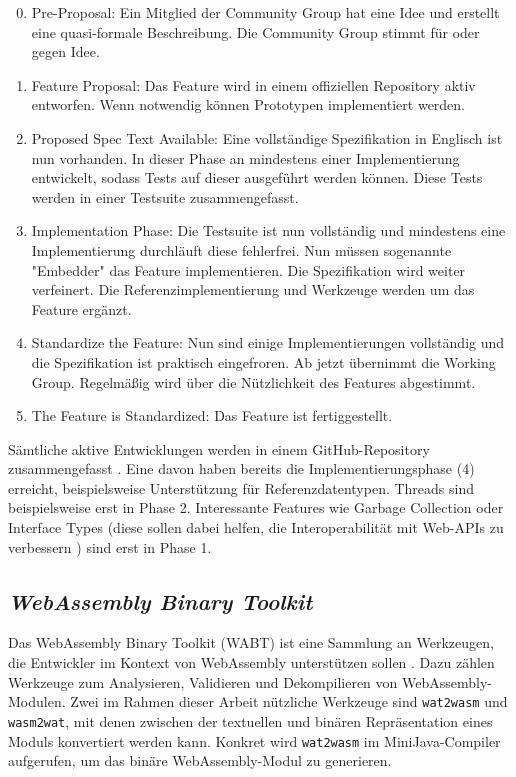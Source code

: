 \begin{enumerate}
    \setcounter{enumi}{-1}
    \item Pre-Proposal: Ein Mitglied der Community Group hat eine Idee und erstellt eine quasi-formale Beschreibung. Die Community Group stimmt für oder gegen Idee.
    \item Feature Proposal: Das Feature wird in einem offiziellen Repository aktiv entworfen. Wenn notwendig können Prototypen implementiert werden.
    \item Proposed Spec Text Available: Eine vollständige Spezifikation in Englisch ist nun vorhanden. In dieser Phase an mindestens einer Implementierung entwickelt, sodass Tests auf dieser ausgeführt werden können. Diese Tests werden in einer Testsuite zusammengefasst.
    \item Implementation Phase: Die Testsuite ist nun vollständig und mindestens eine Implementierung durchläuft diese fehlerfrei. Nun müssen sogenannte "Embedder" das Feature implementieren. Die Spezifikation wird weiter verfeinert. Die Referenzimplementierung und Werkzeuge werden um das Feature ergänzt.
    \item Standardize the Feature: Nun sind einige Implementierungen vollständig und die Spezifikation ist praktisch eingefroren. Ab jetzt übernimmt die Working Group. Regelmäßig wird über die Nützlichkeit des Features abgestimmt.
    \item The Feature is Standardized: Das Feature ist fertiggestellt.
\end{enumerate}

Sämtliche aktive Entwicklungen werden in einem GitHub-Repository zusammengefasst \cite{WebAssemblyProposals}.
Eine davon haben bereits die Implementierungsphase (4) erreicht, beispielsweise Unterstützung für Referenzdatentypen. Threads sind beispielsweise erst in Phase 2. Interessante Features wie Garbage Collection oder Interface Types (diese sollen dabei helfen, die Interoperabilität mit Web-APIs zu verbessern \cite{WebAssemblyInterfaceTypes}) sind erst in Phase 1.

\subsection{\emph{WebAssembly Binary Toolkit}}
Das WebAssembly Binary Toolkit (WABT) ist eine Sammlung an Werkzeugen, die Entwickler im Kontext von WebAssembly unterstützen sollen \cite{WABT}. Dazu zählen Werkzeuge zum Analysieren, Validieren und Dekompilieren von WebAssembly-Modulen. Zwei im Rahmen dieser Arbeit nützliche Werkzeuge sind \lstinline{wat2wasm} und \lstinline{wasm2wat}, mit denen zwischen der textuellen und binären Repräsentation eines Moduls konvertiert werden kann. Konkret wird \lstinline{wat2wasm} im MiniJava-Compiler aufgerufen, um das binäre WebAssembly-Modul zu generieren.

